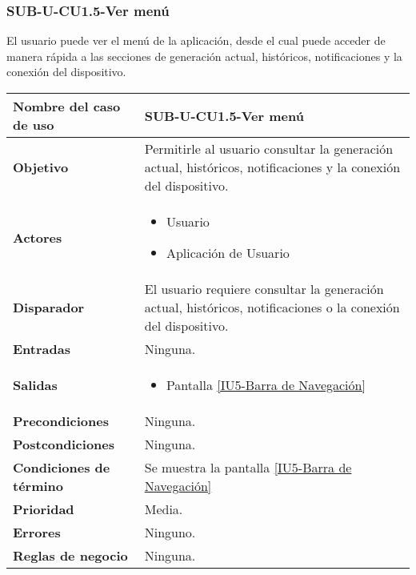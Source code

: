 \subsubsection{SUB-U-CU1.5-Ver menú}\label{SUB-U-CU1.5}
El usuario puede ver el menú de la aplicación, desde el cual puede acceder de manera rápida a las secciones de generación actual, históricos, notificaciones y la conexión del dispositivo.
\begin{longtable}{|J{5cm}|J{10.3cm}|}
	\hline
	\textbf{Nombre del caso de uso} &
		SUB-U-CU1.5-Ver menú \\ \hline
	\textbf{Objetivo} &
		Permitirle al usuario consultar la generación actual, históricos, notificaciones y la conexión del dispositivo. \\ \hline
	\textbf{Actores} &
	    \begin{itemize}
		    \item Usuario
		    \item Aplicación de Usuario
		\end{itemize}\\ \hline
	\textbf{Disparador} & 
		El usuario requiere consultar la generación actual, históricos, notificaciones o la conexión del dispositivo.\\ \hline 
	\textbf{Entradas} & Ninguna.
		\\ \hline 
	\textbf{Salidas} & 
		\begin{itemize}
			\item Pantalla \hyperref[fig:Barra de navegacion]{[IU5-Barra de Navegación]} 
		\end{itemize} \\ \hline
	\textbf{Precondiciones} &
		Ninguna.\\ \hline
	\textbf{Postcondiciones} & Ninguna.
		\\ \hline
	\textbf{Condiciones de término} & Se muestra la pantalla \hyperref[fig:Barra de navegacion]{[IU5-Barra de Navegación]}
		\\ \hline 
	\textbf{Prioridad} & 
		Media. \\ \hline
	\textbf{Errores} & Ninguno.
		\\ \hline
	\textbf{Reglas de negocio} & Ninguna.
		 \\ \hline
\end{longtable}

